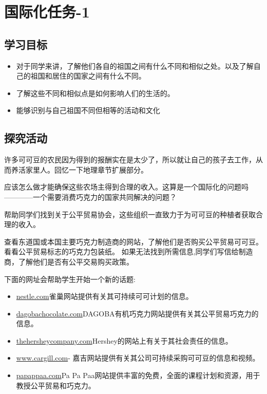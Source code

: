 \chapter{国际化任务-1}

\section{学习目标}
\begin{itemize}
  \item 对于同学来讲，了解他们各自的祖国之间有什么不同和相似之处。以及了解自己的祖国和居住的国家之间有什么不同。
  \item 了解这些不同和相似点是如何影响人们的生活的。
  \item 能够识别与自己祖国不同但相等的活动和文化 
\end{itemize}



\section{探究活动}
   许多可可豆的农民因为得到的报酬实在是太少了，所以就让自己的孩子去工作，从而养活家里人。回忆一下地理章节扩展部分。\par
   应该怎么做才能确保这些农场主得到合理的收入。这算是一个国际化的问题吗————一个需要消费巧克力的国家共同解决的问题？\par
   帮助同学们找到关于公平贸易协会，这些组织一直致力于为可可豆的种植者获取合理的收入。\par
   查看东道国或本国主要巧克力制造商的网站，了解他们是否购买公平贸易可可豆。 看看公平贸易标志的巧克力包装纸。 如果无法找到所需信息,同学们写信给制造商，了解他们是否有公平交易购买政策。\par
   下面的网址会帮助学生开始一个新的话题:\par
   \begin{itemize}
     \item \href{https://www.nestle.co.uk/csv2013/socialimpact/responsiblesourcing/nestlecocoaplan}{nestle.com}雀巢网站提供有关其可持续可可计划的信息。
     \item \href{http://www.dagobachocolate.com/circle.asp}{dagobachocolate.com}DAGOBA有机巧克力网站提供有关其公平贸易巧克力的信息。
     \item \href{http://www.thehersheycompany.com/social-responsibility.aspx}{thehersheycompany.com}Hershey的网站上有关于其社会责任的信息。
     \item \href{https://www.cargill.com/corporate-responsibility/pov/cocoa-sourcing/index.jsp}{www.cargill.com}- 嘉吉网站提供有关其公司可持续采购可可豆的信息和视频。
     \item \href{http://www.papapaa.org}{papappaa.com}Pa Pa Paa网站提供丰富的免费，全面的课程计划和资源，用于教授公平贸易和巧克力。
   \end{itemize}


